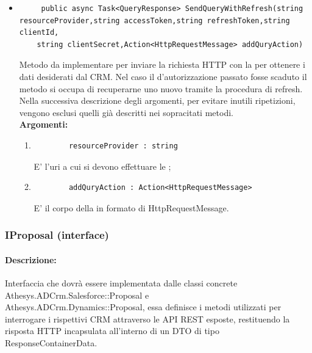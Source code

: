 \begin{itemize}
	\item 
	\begin{lstlisting}
	 public async Task<QueryResponse> SendQueryWithRefresh(string resourceProvider,string accessToken,string refreshToken,string clientId,
	string clientSecret,Action<HttpRequestMessage> addQuryAction)
	\end{lstlisting}
	Metodo da implementare per inviare la richiesta HTTP con la  per ottenere i dati desiderati dal CRM. Nel caso il  d'autorizzazione passato fosse scaduto il metodo si occupa di recuperarne uno nuovo tramite la procedura di refresh. Nella successiva descrizione degli argomenti, per evitare inutili ripetizioni, vengono esclusi quelli già descritti nei sopracitati metodi.\\
	\textbf{\small Argomenti:}
	\begin{enumerate}[leftmargin=*]
		\itemsep0em
		\item 
		\begin{lstlisting}
		resourceProvider : string
		\end{lstlisting}
		E' l'uri a cui si devono effettuare le ;
		\item 
		\begin{lstlisting}
		addQuryAction : Action<HttpRequestMessage>
		\end{lstlisting}
		E' il corpo della  in formato di HttpRequestMessage. 
	\end{enumerate}
\end{itemize}

\subsubsection{IProposal (interface)}

\paragraph{Descrizione:}
Interfaccia che dovrà essere implementata dalle classi concrete Athesys.ADCrm.Salesforce::Proposal e\\ Athesys.ADCrm.Dynamics::Proposal, essa definisce i metodi utilizzati per interrogare i rispettivi CRM attraverso le API REST esposte, restituendo la risposta HTTP incapsulata all'interno di un DTO di tipo ResponseContainerData.

